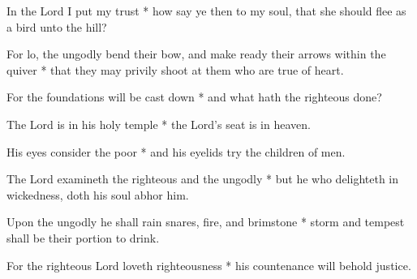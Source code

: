 In the Lord I put my trust * how say ye then to my soul, that she should flee as a bird unto the hill?

For lo, the ungodly bend their bow, and make ready their arrows within the quiver * that they may privily shoot at them who are true of heart.

For the foundations will be cast down * and what hath the righteous done?

The Lord is in his holy temple * the Lord's seat is in heaven.

His eyes consider the poor * and his eyelids try the children of men.

The Lord examineth the righteous and the ungodly * but he who delighteth in wickedness, doth his soul abhor him.

Upon the ungodly he shall rain snares, fire, and brimstone * storm and tempest shall be their portion to drink.

For the righteous Lord loveth righteousness * his countenance will behold justice.